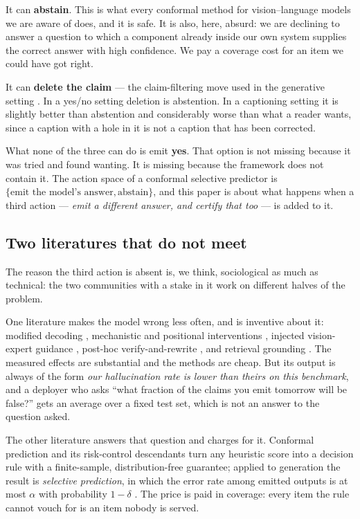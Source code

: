 \documentclass[review,number,doubleblind]{elsarticle}
\theoremstyle{plain}
\theoremstyle{definition}
\theoremstyle{remark}
\begin{document}
It can \textbf{abstain}. This is what every conformal method for vision--language models
we are aware of does, and it is safe. It is also, here, absurd: we are declining to answer
a question to which a component already inside our own system supplies the correct answer
with high confidence. We pay a coverage cost for an item we could have got right.

It can \textbf{delete the claim} --- the claim-filtering move used in the generative
setting \citep{conflvlm,conformalfactuality}. In a yes/no setting deletion is abstention.
In a captioning setting it is slightly better than abstention and considerably worse than
what a reader wants, since a caption with a hole in it is not a caption that has been
corrected.

What none of the three can do is emit \textbf{yes}. That option is not missing because it
was tried and found wanting. It is missing because the framework does not contain it. The
action space of a conformal selective predictor is $\{\text{emit the model's answer},
\text{abstain}\}$, and this paper is about what happens when a third action ---
\emph{emit a different answer, and certify that too} --- is added to it.

\subsection{Two literatures that do not meet}

The reason the third action is absent is, we think, sociological as much as technical: the
two communities with a stake in it work on different halves of the problem.

One literature makes the model wrong less often, and is inventive about it: modified
decoding \citep{opera,vcd,degf}, mechanistic and positional interventions
\citep{attnlens,only,maskcd,causalgating,mcallava}, injected vision-expert guidance
\citep{marine}, post-hoc verify-and-rewrite \citep{woodpecker,lure,reverse}, and retrieval
grounding \citep{mkgrag,rule}. The measured effects are substantial and the methods are
cheap. But its output is always of the form \emph{our hallucination rate is lower than
theirs on this benchmark}, and a deployer who asks ``what fraction of the claims you emit
tomorrow will be false?'' gets an average over a fixed test set, which is not an answer to
the question asked.

The other literature answers that question and charges for it. Conformal prediction and its
risk-control descendants turn any heuristic score into a decision rule with a finite-sample,
distribution-free guarantee; applied to generation the result is \emph{selective prediction},
in which the error rate among emitted outputs is at most $\alpha$ with probability $1-\delta$
\citep{conformallm,conformalfactuality,conflvlm,onlineabstention}. The price is paid in
coverage: every item the rule cannot vouch for is an item nobody is served.
\end{document}
